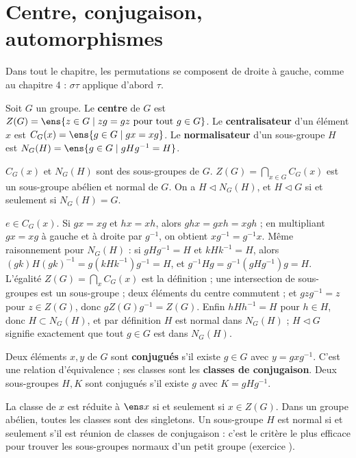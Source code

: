 \section{Centre, conjugaison, automorphismes}
Dans tout le chapitre, les permutations se composent de droite à gauche, comme au chapitre 4 : $\sigma\tau$ applique d'abord $\tau$.
\begin{definition}
Soit $G$ un groupe. Le \textbf{centre} de $G$ est $Z(G)=\ens{z\in G\mid zg=gz\text{ pour tout }g\in G}$. Le \textbf{centralisateur} d'un élément $x$ est $C_G(x)=\ens{g\in G\mid gx=xg}$. Le \textbf{normalisateur} d'un sous-groupe $H$ est $N_G(H)=\ens{g\in G\mid gHg^{-1}=H}$.
\end{definition}
\begin{proposition}\label{prop-centre}
$C_G(x)$ et $N_G(H)$ sont des sous-groupes de $G$. $Z(G)=\bigcap_{x\in G}C_G(x)$ est un sous-groupe abélien et normal de $G$. On a $H\lhd N_G(H)$, et $H\lhd G$ si et seulement si $N_G(H)=G$.
\end{proposition}
\begin{preuve}
$e\in C_G(x)$. Si $gx=xg$ et $hx=xh$, alors $ghx=gxh=xgh$ ; en multipliant $gx=xg$ à gauche et à droite par $g^{-1}$, on obtient $xg^{-1}=g^{-1}x$. Même raisonnement pour $N_G(H)$ : si $gHg^{-1}=H$ et $kHk^{-1}=H$, alors $(gk)H(gk)^{-1}=g(kHk^{-1})g^{-1}=H$, et $g^{-1}Hg=g^{-1}(gHg^{-1})g=H$. L'égalité $Z(G)=\bigcap_xC_G(x)$ est la définition ; une intersection de sous-groupes est un sous-groupe ; deux éléments du centre commutent ; et $gzg^{-1}=z$ pour $z\in Z(G)$, donc $gZ(G)g^{-1}=Z(G)$. Enfin $hHh^{-1}=H$ pour $h\in H$, donc $H\subset N_G(H)$, et par définition $H$ est normal dans $N_G(H)$ ; $H\lhd G$ signifie exactement que tout $g\in G$ est dans $N_G(H)$.
\end{preuve}
\begin{definition}[Conjugaison]
Deux éléments $x,y$ de $G$ sont \textbf{conjugués} s'il existe $g\in G$ avec $y=gxg^{-1}$. C'est une relation d'équivalence ; ses classes sont les \textbf{classes de conjugaison}. Deux sous-groupes $H,K$ sont conjugués s'il existe $g$ avec $K=gHg^{-1}$.
\end{definition}
\begin{remarque}
La classe de $x$ est réduite à $\ens x$ si et seulement si $x\in Z(G)$. Dans un groupe abélien, toutes les classes sont des singletons. Un sous-groupe $H$ est normal si et seulement s'il est réunion de classes de conjugaison : c'est le critère le plus efficace pour trouver les sous-groupes normaux d'un petit groupe (exercice ).
\end{remarque}
